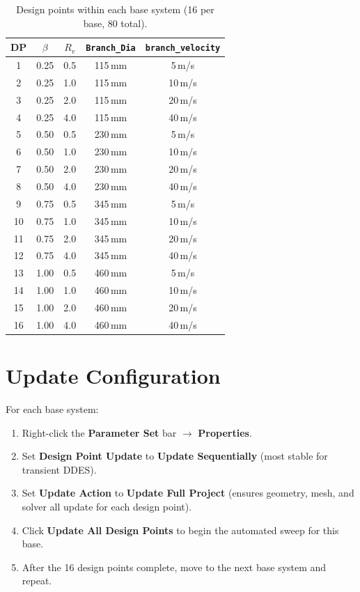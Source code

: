 \documentclass[12pt,a4paper]{report}
\begin{document}
\begin{table}[H]
\centering
\caption{Design points within each base system (16 per base, 80 total).}
\label{tab:designpoints}
\begin{tabular}{@{}ccccc@{}}
\toprule
\textbf{DP} & $\beta$ & $R_v$ &
\texttt{Branch\_Dia} & \texttt{branch\_velocity} \\
\midrule
1  & 0.25 & 0.5 & 115\,mm &  5\,m/s \\
2  & 0.25 & 1.0 & 115\,mm & 10\,m/s \\
3  & 0.25 & 2.0 & 115\,mm & 20\,m/s \\
4  & 0.25 & 4.0 & 115\,mm & 40\,m/s \\
5  & 0.50 & 0.5 & 230\,mm &  5\,m/s \\
6  & 0.50 & 1.0 & 230\,mm & 10\,m/s \\
7  & 0.50 & 2.0 & 230\,mm & 20\,m/s \\
8  & 0.50 & 4.0 & 230\,mm & 40\,m/s \\
9  & 0.75 & 0.5 & 345\,mm &  5\,m/s \\
10 & 0.75 & 1.0 & 345\,mm & 10\,m/s \\
11 & 0.75 & 2.0 & 345\,mm & 20\,m/s \\
12 & 0.75 & 4.0 & 345\,mm & 40\,m/s \\
13 & 1.00 & 0.5 & 460\,mm &  5\,m/s \\
14 & 1.00 & 1.0 & 460\,mm & 10\,m/s \\
15 & 1.00 & 2.0 & 460\,mm & 20\,m/s \\
16 & 1.00 & 4.0 & 460\,mm & 40\,m/s \\
\bottomrule
\end{tabular}
\end{table}


\section{Update Configuration}

For each base system:

\begin{enumerate}
  \item Right-click the \textbf{Parameter Set} bar $\rightarrow$
        \textbf{Properties}.
  \item Set \textbf{Design Point Update} to \textbf{Update Sequentially}
        (most stable for transient DDES).
  \item Set \textbf{Update Action} to \textbf{Update Full Project}
        (ensures geometry, mesh, and solver all update for each design
        point).
  \item Click \textbf{Update All Design Points} to begin the automated
        sweep for this base.
  \item After the 16 design points complete, move to the next base
        system and repeat.
\end{enumerate}
\end{document}
